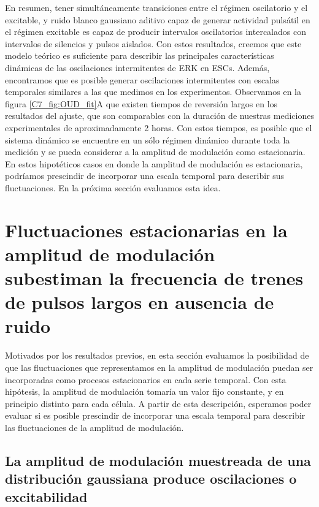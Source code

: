\documentclass[./main.tex]{subfiles}
\begin{document}
En resumen, tener simultáneamente transiciones entre el régimen oscilatorio y el excitable, y ruido blanco gaussiano aditivo capaz de generar actividad pulsátil en el régimen excitable es capaz de producir intervalos oscilatorios intercalados con intervalos de silencios y pulsos aislados. Con estos resultados, creemos que este modelo teórico es suficiente para describir las principales características dinámicas de las oscilaciones intermitentes de ERK en ESCs. Además, encontramos que es posible generar oscilaciones intermitentes con escalas temporales similares a las que medimos en los experimentos. Observamos en la figura \ref{C7_fig:OUD_fit}A que existen tiempos de reversión largos en los resultados del ajuste, que son comparables con la duración de nuestras mediciones experimentales de aproximadamente 2 horas. Con estos tiempos, es posible que el sistema dinámico se encuentre en un sólo régimen dinámico durante toda la medición y se pueda considerar a la amplitud de modulación como estacionaria. En estos hipotéticos casos en donde la amplitud de modulación es estacionaria, podríamos prescindir de incorporar una escala temporal para describir sus fluctuaciones. En la próxima sección evaluamos esta idea.


\section{Fluctuaciones estacionarias en la amplitud de modulación subestiman la frecuencia de trenes de pulsos largos en ausencia de ruido}
\label{C7_sec:dist}

Motivados por los resultados previos, en esta sección evaluamos la posibilidad de que las fluctuaciones que representamos en la amplitud de modulación puedan ser incorporadas como procesos estacionarios en cada serie temporal. Con esta hipótesis, la amplitud de modulación tomaría un valor fijo constante, y en principio distinto para cada célula. A partir de esta descripción, esperamos poder evaluar si es posible prescindir de incorporar una escala temporal para describir las fluctuaciones de la amplitud de modulación.


\subsection{La amplitud de modulación muestreada de una distribución gaussiana produce oscilaciones o excitabilidad}
\end{document}
